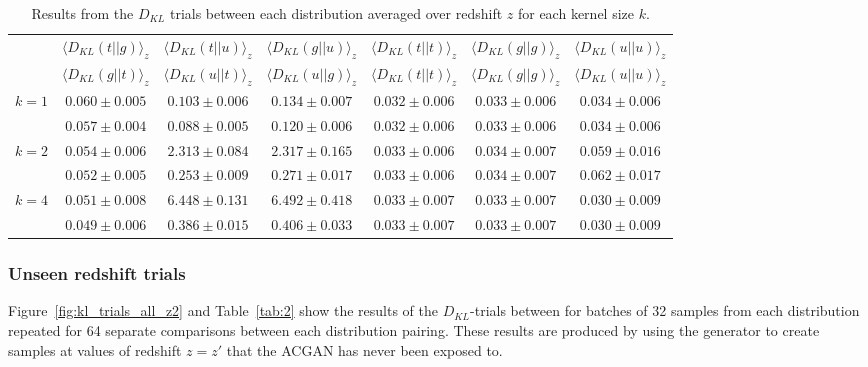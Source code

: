 \documentclass[twocolumn]{article}
\numberwithin{equation}{section}
\begin{document}
\begin{table}[t]
  \centering
  \begin{tabular}{|ccccccc|}
    \hline\hline
          & $\langle D_{KL}(t||g) \rangle_z$ & $\langle D_{KL}(t||u) \rangle_z$ & $\langle D_{KL}(g||u)\rangle_z$ & $\langle D_{KL}(t||t)\rangle_z$ & $\langle D_{KL}(g||g) \rangle_z$ & $\langle D_{KL}(u||u) \rangle_z$ \\ 
          &  $\langle D_{KL}(g||t)\rangle_z$ & $\langle D_{KL}(u||t)\rangle_z$ & $\langle D_{KL}(u||g)\rangle_z$ & $\langle D_{KL}(t||t) \rangle_z$ & $\langle D_{KL}(g||g)\rangle_z$  & $\langle D_{KL}(u||u)\rangle_z$ \\ [1.0ex]
    \hline\hline
    
    $k=1$ & $0.060\pm0.005$ & $0.103\pm0.006$ & $0.134\pm0.007$ & $0.032\pm0.006$ & $0.033\pm0.006$ & $0.034\pm0.006$ \\
          & $0.057\pm0.004$ & $0.088\pm0.005$ & $0.120\pm0.006$ & $0.032\pm0.006$ & $0.033\pm0.006$ & $0.034\pm0.006$ \\ [1ex]

    $k=2$ & $0.054\pm0.006$ & $2.313\pm0.084$ & $2.317\pm0.165$ & $0.033\pm0.006$ & $0.034\pm0.007$ & $0.059\pm0.016$ \\
          & $0.052\pm0.005$ & $0.253\pm0.009$ & $0.271\pm0.017$ & $0.033\pm0.006$ & $0.034\pm0.007$ & $0.062\pm0.017$ \\ [1ex]
               
    $k=4$ & $0.051\pm0.008$ & $6.448\pm0.131$ & $6.492\pm0.418$ & $0.033\pm0.007$ & $0.033\pm0.007$ & $0.030\pm0.009$ \\
          & $0.049\pm0.006$ & $0.386\pm0.015$ & $0.406\pm0.033$ & $0.033\pm0.007$ & $0.033\pm0.007$ & $0.030\pm0.009$ \\ [1ex]
    
    \hline\hline
  \end{tabular}
  \caption{Results from the $D_{KL}$ trials between each distribution averaged over redshift $z$ for each kernel size $k$.}
  \label{tab:1}
\end{table}


\subsubsection{Unseen redshift trials}

Figure~\ref{fig:kl_trials_all_z2} and Table~\ref{tab:2} show the results of the $D_{KL}$-trials between for batches of 32 
samples from each distribution repeated for 64 separate comparisons between each distribution pairing. These results are 
produced by using the generator to create samples at values of redshift $z=z'$ that the ACGAN has never been exposed to.
\end{document}
